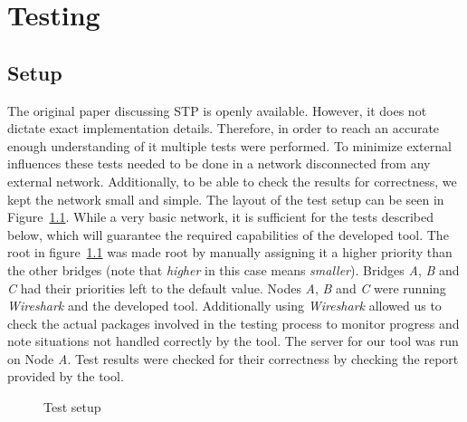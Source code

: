 \chapter{Testing}
\label{testing}
\section{Setup}
The original paper discussing STP is openly available.
However, it does not dictate exact implementation details.
Therefore, in order to reach an accurate enough understanding of it multiple tests were performed.
To minimize external influences these tests needed to be done in a network disconnected from any external network.
Additionally, to be able to check the results for correctness, we kept the network small and simple.
The layout of the test setup can be seen in Figure~\ref{fig:test_setup}.
While a very basic network, it is sufficient for the tests described below, which will guarantee the required capabilities of the developed tool.
The root in figure~\ref{fig:test_setup} was made root by manually assigning it a higher priority than the other bridges (note that \textit{higher} in this case means \textit{smaller}).
Bridges \textit{A}, \textit{B} and \textit{C} had their priorities left to the default value.
Nodes \textit{A}, \textit{B} and \textit{C} were running \textit{Wireshark} and the developed tool.
Additionally using \textit{Wireshark} allowed us to check the actual packages involved in the testing process to monitor progress and note situations not handled correctly by the tool.
The server for our tool was run on Node \textit{A}.
Test results were checked for their correctness by checking the report provided by the tool.

\begin{figure}[h]
    \centering
    \caption{Test setup}
    \label{fig:test_setup}
\end{figure}

